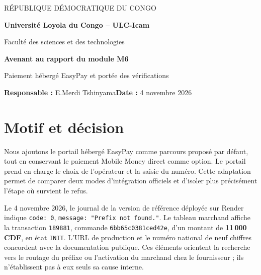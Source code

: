 \documentclass[11pt,a4paper]{article}
\begin{document}
{\small RÉPUBLIQUE DÉMOCRATIQUE DU CONGO\par}
{\large\bfseries Université Loyola du Congo -- ULC-Icam\par}
Faculté des sciences et des technologies\par
\vspace{7mm}
{\LARGE\bfseries\color{navy} Avenant au rapport du module M6\par}
{\large Paiement hébergé EasyPay et portée des vérifications\par}
\vspace{3mm}
\textbf{Responsable :} E.Merdi Tshinyama\hfill\textbf{Date :} 4 novembre 2026

\section{Motif et décision}
Nous ajoutons le portail hébergé EasyPay comme parcours proposé par défaut, tout en conservant le paiement Mobile Money direct comme option. Le portail prend en charge le choix de l'opérateur et la saisie du numéro. Cette adaptation permet de comparer deux modes d'intégration officiels et d'isoler plus précisément l'étape où survient le refus.

Le 4 novembre 2026, le journal de la version de référence déployée sur Render indique \texttt{code: 0}, \texttt{message: "Prefix not found."}. Le tableau marchand affiche la transaction \texttt{189881}, commande \texttt{6bb65c0381ced42e}, d'un montant de \textbf{11\,000 CDF}, en état \texttt{INIT}. L'URL de production et le numéro national de neuf chiffres concordent avec la documentation publique. Ces éléments orientent la recherche vers le routage du préfixe ou l'activation du marchand chez le fournisseur ; ils n'établissent pas à eux seuls sa cause interne.
\end{document}

